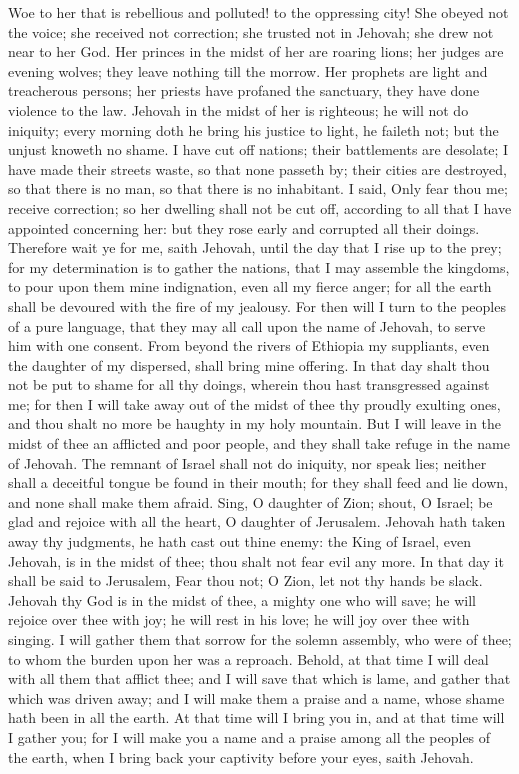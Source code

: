 Woe to her that is rebellious and polluted! to the oppressing city! She obeyed not the voice; she received not correction; she trusted not in Jehovah; she drew not near to her God. Her princes in the midst of her are roaring lions; her judges are evening wolves; they leave nothing till the morrow. Her prophets are light and treacherous persons; her priests have profaned the sanctuary, they have done violence to the law. Jehovah in the midst of her is righteous; he will not do iniquity; every morning doth he bring his justice to light, he faileth not; but the unjust knoweth no shame. I have cut off nations; their battlements are desolate; I have made their streets waste, so that none passeth by; their cities are destroyed, so that there is no man, so that there is no inhabitant. I said, Only fear thou me; receive correction; so her dwelling shall not be cut off, according to all that I have appointed concerning her: but they rose early and corrupted all their doings.  Therefore wait ye for me, saith Jehovah, until the day that I rise up to the prey; for my determination is to gather the nations, that I may assemble the kingdoms, to pour upon them mine indignation, even all my fierce anger; for all the earth shall be devoured with the fire of my jealousy.  For then will I turn to the peoples of a pure language, that they may all call upon the name of Jehovah, to serve him with one consent. From beyond the rivers of Ethiopia my suppliants, even the daughter of my dispersed, shall bring mine offering. In that day shalt thou not be put to shame for all thy doings, wherein thou hast transgressed against me; for then I will take away out of the midst of thee thy proudly exulting ones, and thou shalt no more be haughty in my holy mountain. But I will leave in the midst of thee an afflicted and poor people, and they shall take refuge in the name of Jehovah. The remnant of Israel shall not do iniquity, nor speak lies; neither shall a deceitful tongue be found in their mouth; for they shall feed and lie down, and none shall make them afraid.  Sing, O daughter of Zion; shout, O Israel; be glad and rejoice with all the heart, O daughter of Jerusalem. Jehovah hath taken away thy judgments, he hath cast out thine enemy: the King of Israel, even Jehovah, is in the midst of thee; thou shalt not fear evil any more. In that day it shall be said to Jerusalem, Fear thou not; O Zion, let not thy hands be slack. Jehovah thy God is in the midst of thee, a mighty one who will save; he will rejoice over thee with joy; he will rest in his love; he will joy over thee with singing. I will gather them that sorrow for the solemn assembly, who were of thee; to whom the burden upon her was a reproach. Behold, at that time I will deal with all them that afflict thee; and I will save that which is lame, and gather that which was driven away; and I will make them a praise and a name, whose shame hath been in all the earth. At that time will I bring you in, and at that time will I gather you; for I will make you a name and a praise among all the peoples of the earth, when I bring back your captivity before your eyes, saith Jehovah. 